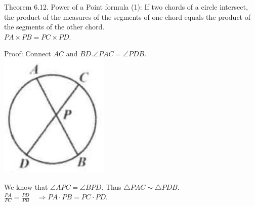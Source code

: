 \documentclass{article}
\begin{document}
Theorem 6.12. Power of a Point formula (1): If two chords of a circle intersect, the product of the measures of the segments of one chord equals the product of the segments of the other chord.\\
\(P A \times P B=P C \times P D\).

Proof:
Connect \(A C\) and \(B D . \angle P A C=\angle P D B\).\\
\centering
\includegraphics[width=\textwidth]{images/192.jpg}

We know that \(\angle A P C=\angle B P D\). Thus \(\triangle P A C \sim \triangle P D B\).\\
\(\frac{P A}{P C}=\frac{P D}{P B} \quad \Rightarrow P A \cdot P B=P C \cdot P D\).
\end{document}
